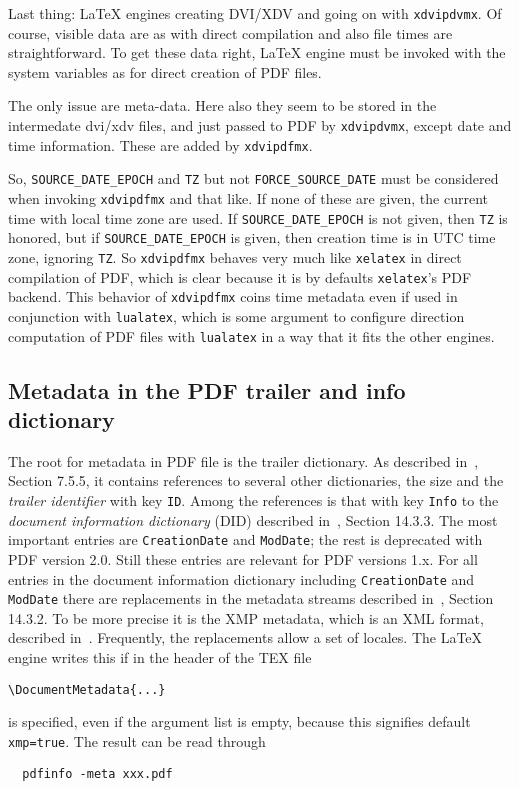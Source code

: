 \documentclass[a4paper, english]{article}%
\newcommand{\lualatex}{\texttt{lualatex}}
\newcommand{\xelatex}{\texttt{xelatex}}
\begin{document}
Last thing: 
\LaTeX{} engines creating DVI/XDV and going on with \texttt{xdvipdvmx}. 
Of course, visible data are as with direct compilation and also file times are straightforward. 
To get these data right, \LaTeX{} engine must be invoked with the system variables 
as for direct creation of PDF files. 

The only issue are meta-data. 
Here also they seem to be stored in the intermedate dvi/xdv files, 
and just passed to PDF by \texttt{xdvipdvmx}, 
except date and time information. 
These are added by \texttt{xdvipdfmx}. 

So, \texttt{SOURCE\_DATE\_EPOCH} and \texttt{TZ} but not \texttt{FORCE\_SOURCE\_DATE} 
must be considered when invoking \texttt{xdvipdfmx} and that like. 
If none of these are given, the current time with local time zone are used. 
If \texttt{SOURCE\_DATE\_EPOCH} is not given, then \texttt{TZ} is honored, 
but if \texttt{SOURCE\_DATE\_EPOCH} is given, then creation time is in UTC time zone, 
ignoring \texttt{TZ}. 
So \texttt{xdvipdfmx} behaves very much like \xelatex{} in direct compilation of PDF, 
which is clear because it is by defaults \xelatex's PDF backend. 
This behavior of \texttt{xdvipdfmx} coins time metadata even if used in conjunction with \lualatex, 
which is some argument to configure direction computation of PDF files with \lualatex{} 
in a way that it fits the other engines. 



\subsection{Metadata in the PDF trailer and info dictionary}\label{subsec:trailerInfoDict}

The root for metadata in PDF file is the trailer dictionary. 
As described in~\cite{Pdf20}, Section 7.5.5, 
it contains references to several other dictionaries, 
the size and the \emph{trailer identifier} with key \texttt{ID}. 
Among the references is that with key \texttt{Info} 
to the \emph{document information dictionary} (DID) described in~\cite{Pdf20}, Section 14.3.3. 
The most important entries are \texttt{CreationDate} and \texttt{ModDate}; 
the rest is deprecated with PDF version 2.0. 
Still these entries are relevant for PDF versions 1.x. 
For all entries in the document information dictionary including \texttt{CreationDate} and \texttt{ModDate} 
there are replacements in the metadata streams described in~\cite{Pdf20}, Section 14.3.2. 
To be more precise it is the XMP metadata, which is an XML format, described in~\cite{ISO16684-1}. 
Frequently, the replacements allow a set of locales. 
The \LaTeX{} engine writes this if in the header of the TEX file 
%
\begin{verbatim}
\DocumentMetadata{...}
\end{verbatim}
%
is specified, even if the argument list is empty, because this signifies default \texttt{xmp=true}. 
The result can be read through 
%
\begin{verbatim}
  pdfinfo -meta xxx.pdf
\end{verbatim}
\end{document}
